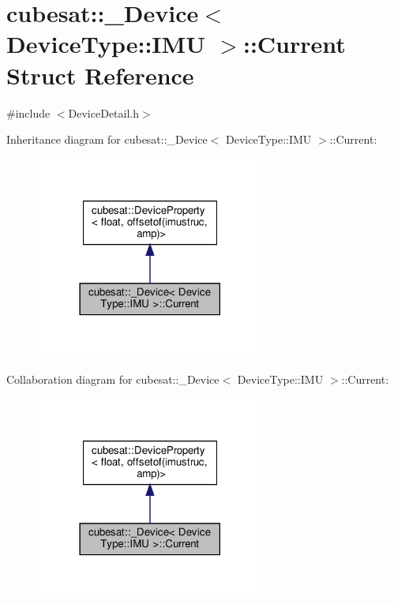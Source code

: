 \hypertarget{structcubesat_1_1__Device_3_01DeviceType_1_1IMU_01_4_1_1Current}{}\section{cubesat\+:\+:\+\_\+\+Device$<$ Device\+Type\+:\+:I\+MU $>$\+:\+:Current Struct Reference}
\label{structcubesat_1_1__Device_3_01DeviceType_1_1IMU_01_4_1_1Current}


{\ttfamily \#include $<$Device\+Detail.\+h$>$}



Inheritance diagram for cubesat\+:\+:\+\_\+\+Device$<$ Device\+Type\+:\+:I\+MU $>$\+:\+:Current\+:\nopagebreak
\begin{figure}[H]
\begin{center}
\leavevmode
\includegraphics[width=213pt]{structcubesat_1_1__Device_3_01DeviceType_1_1IMU_01_4_1_1Current__inherit__graph}
\end{center}
\end{figure}


Collaboration diagram for cubesat\+:\+:\+\_\+\+Device$<$ Device\+Type\+:\+:I\+MU $>$\+:\+:Current\+:\nopagebreak
\begin{figure}[H]
\begin{center}
\leavevmode
\includegraphics[width=213pt]{structcubesat_1_1__Device_3_01DeviceType_1_1IMU_01_4_1_1Current__coll__graph}
\end{center}
\end{figure}
